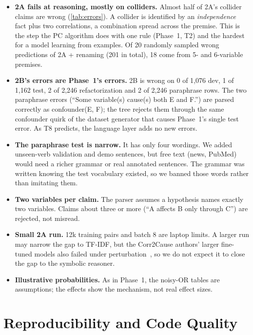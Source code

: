 \documentclass[12pt,a4paper]{article}
\begin{document}
\begin{itemize}
  \item \textbf{2A fails at reasoning, mostly on colliders.} Almost half of 2A's collider claims are wrong (\cref{tab:errors}). A
        collider is identified by an \emph{independence} fact plus two correlations, a combination spread across the premise.
        This is the step the PC algorithm does with one rule (Phase~1, T2) and the hardest for a model learning from examples.
        Of 20 randomly sampled wrong predictions of 2A + renaming (201 in total), 18 come from 5- and 6-variable premises.
  \item \textbf{2B's errors are Phase~1's errors.} 2B is wrong on 0 of 1{,}076 dev, 1 of 1{,}162 test, 2 of 2{,}246 refactorization
        and 2 of 2{,}246 paraphrase rows. The two paraphrase errors (``Some variable(s) cause(s) both E and F.'') are parsed
        correctly as confounder(E, F); the tree rejects them through the same confounder quirk of the dataset generator that
        causes Phase~1's single test error. As T8 predicts, the language layer adds no new errors.
  \item \textbf{The paraphrase test is narrow.} It has only four wordings. We added unseen-verb validation and demo sentences, but
        free text (news, PubMed) would need a richer grammar or real annotated sentences. The grammar was written knowing the test
        vocabulary existed, so we banned those words rather than imitating them.
  \item \textbf{Two variables per claim.} The parser assumes a hypothesis names exactly two variables. Claims about three or more
        (``A affects B only through C'') are rejected, not misread.
  \item \textbf{Small 2A run.} 12k training pairs and batch 8 are laptop limits. A larger run may narrow the gap to TF-IDF, but the
        Corr2Cause authors' larger fine-tuned models also failed under perturbation~\cite{jin2024corr2cause}, so we do not expect it
        to close the gap to the symbolic reasoner.
  \item \textbf{Illustrative probabilities.} As in Phase~1, the noisy-OR tables are assumptions; the effects show the mechanism, not
        real effect sizes.
\end{itemize}

\section{Reproducibility and Code Quality}\label{sec:repro}
\end{document}
